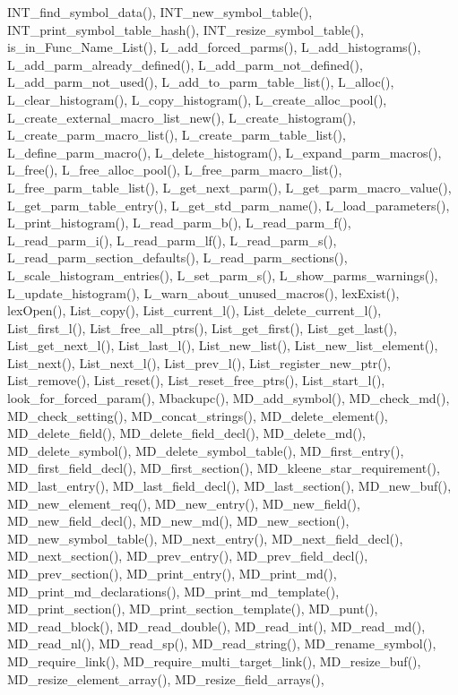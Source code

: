INT\_\-find\_\-symbol\_\-data(), INT\_\-new\_\-symbol\_\-table(), INT\_\-print\_\-symbol\_\-table\_\-hash(), INT\_\-resize\_\-symbol\_\-table(), is\_\-in\_\-Func\_\-Name\_\-List(), L\_\-add\_\-forced\_\-parms(), L\_\-add\_\-histograms(), L\_\-add\_\-parm\_\-already\_\-defined(), L\_\-add\_\-parm\_\-not\_\-defined(), L\_\-add\_\-parm\_\-not\_\-used(), L\_\-add\_\-to\_\-parm\_\-table\_\-list(), L\_\-alloc(), L\_\-clear\_\-histogram(), L\_\-copy\_\-histogram(), L\_\-create\_\-alloc\_\-pool(), L\_\-create\_\-external\_\-macro\_\-list\_\-new(), L\_\-create\_\-histogram(), L\_\-create\_\-parm\_\-macro\_\-list(), L\_\-create\_\-parm\_\-table\_\-list(), L\_\-define\_\-parm\_\-macro(), L\_\-delete\_\-histogram(), L\_\-expand\_\-parm\_\-macros(), L\_\-free(), L\_\-free\_\-alloc\_\-pool(), L\_\-free\_\-parm\_\-macro\_\-list(), L\_\-free\_\-parm\_\-table\_\-list(), L\_\-get\_\-next\_\-parm(), L\_\-get\_\-parm\_\-macro\_\-value(), L\_\-get\_\-parm\_\-table\_\-entry(), L\_\-get\_\-std\_\-parm\_\-name(), L\_\-load\_\-parameters(), L\_\-print\_\-histogram(), L\_\-read\_\-parm\_\-b(), L\_\-read\_\-parm\_\-f(), L\_\-read\_\-parm\_\-i(), L\_\-read\_\-parm\_\-lf(), L\_\-read\_\-parm\_\-s(), L\_\-read\_\-parm\_\-section\_\-defaults(), L\_\-read\_\-parm\_\-sections(), L\_\-scale\_\-histogram\_\-entries(), L\_\-set\_\-parm\_\-s(), L\_\-show\_\-parms\_\-warnings(), L\_\-update\_\-histogram(), L\_\-warn\_\-about\_\-unused\_\-macros(), lex\-Exist(), lex\-Open(), List\_\-copy(), List\_\-current\_\-l(), List\_\-delete\_\-current\_\-l(), List\_\-first\_\-l(), List\_\-free\_\-all\_\-ptrs(), List\_\-get\_\-first(), List\_\-get\_\-last(), List\_\-get\_\-next\_\-l(), List\_\-last\_\-l(), List\_\-new\_\-list(), List\_\-new\_\-list\_\-element(), List\_\-next(), List\_\-next\_\-l(), List\_\-prev\_\-l(), List\_\-register\_\-new\_\-ptr(), List\_\-remove(), List\_\-reset(), List\_\-reset\_\-free\_\-ptrs(), List\_\-start\_\-l(), look\_\-for\_\-forced\_\-param(), Mbackupc(), MD\_\-add\_\-symbol(), MD\_\-check\_\-md(), MD\_\-check\_\-setting(), MD\_\-concat\_\-strings(), MD\_\-delete\_\-element(), MD\_\-delete\_\-field(), MD\_\-delete\_\-field\_\-decl(), MD\_\-delete\_\-md(), MD\_\-delete\_\-symbol(), MD\_\-delete\_\-symbol\_\-table(), MD\_\-first\_\-entry(), MD\_\-first\_\-field\_\-decl(), MD\_\-first\_\-section(), MD\_\-kleene\_\-star\_\-requirement(), MD\_\-last\_\-entry(), MD\_\-last\_\-field\_\-decl(), MD\_\-last\_\-section(), MD\_\-new\_\-buf(), MD\_\-new\_\-element\_\-req(), MD\_\-new\_\-entry(), MD\_\-new\_\-field(), MD\_\-new\_\-field\_\-decl(), MD\_\-new\_\-md(), MD\_\-new\_\-section(), MD\_\-new\_\-symbol\_\-table(), MD\_\-next\_\-entry(), MD\_\-next\_\-field\_\-decl(), MD\_\-next\_\-section(), MD\_\-prev\_\-entry(), MD\_\-prev\_\-field\_\-decl(), MD\_\-prev\_\-section(), MD\_\-print\_\-entry(), MD\_\-print\_\-md(), MD\_\-print\_\-md\_\-declarations(), MD\_\-print\_\-md\_\-template(), MD\_\-print\_\-section(), MD\_\-print\_\-section\_\-template(), MD\_\-punt(), MD\_\-read\_\-block(), MD\_\-read\_\-double(), MD\_\-read\_\-int(), MD\_\-read\_\-md(), MD\_\-read\_\-nl(), MD\_\-read\_\-sp(), MD\_\-read\_\-string(), MD\_\-rename\_\-symbol(), MD\_\-require\_\-link(), MD\_\-require\_\-multi\_\-target\_\-link(), MD\_\-resize\_\-buf(), MD\_\-resize\_\-element\_\-array(), MD\_\-resize\_\-field\_\-arrays(), 